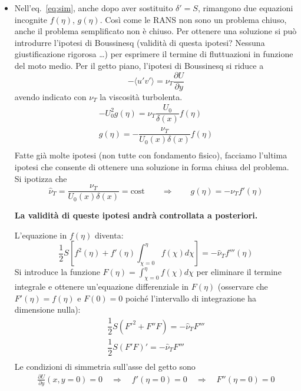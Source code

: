 \begin{itemize}
\item Nell'eq.~\ref{eq:sim}, anche dopo aver sostituito $\delta' = S$, 
 rimangono due equazioni incognite $f(\eta)$, $g(\eta)$. Così come 
 le RANS non sono un problema chiuso, anche il problema semplificato
 non è chiuso.
 Per ottenere una soluzione si può introdurre l'ipotesi di Boussinesq
 (validità di questa ipotesi? Nessuna giustificazione rigorosa \dots)
 per esprimere il termine di fluttuazioni in funzione del moto medio.
 Per il getto piano, l'ipotesi di Boussinesq si riduce a
 \begin{equation}
  - \langle u'v' \rangle = \nu_T \dfrac{\partial U}{\partial y}
 \end{equation}
 avendo indicato con $\nu_T$ la viscosità turbolenta.
 \begin{gather}
  - U^2_0 g(\eta) = \nu_T \dfrac{U_0}{\delta(x)} f(\eta) \\
   g(\eta) = - \dfrac{\nu_T}{U_0(x)\delta(x)} f(\eta) \\
 \end{gather}
 Fatte già molte ipotesi (non tutte con fondamento fisico), facciamo 
 l'ultima ipotesi che consente di ottenere una soluzione in forma 
 chiusa del problema. Si ipotizza che 
 \begin{equation}
  \hat{\nu}_T = \dfrac{\nu_T}{U_0(x)\delta(x)} = \text{cost}
  \qquad \Rightarrow \qquad g(\eta) = - \nu_T f'(\eta)
 \end{equation}

 \textbf{La validità di queste ipotesi andrà controllata
 a posteriori.}

 L'equazione in $f(\eta)$ diventa:
 \begin{equation}
  \dfrac{1}{2} S \left[ f^2(\eta)
    + f'(\eta)\int_{\chi=0}^{\eta} f(\chi) d\chi \right] = 
    - \hat{\nu}_T f'''(\eta)
 \end{equation}
 Si introduce la funzione $F(\eta) = \int_{\chi=0}^{\eta} f(\chi)d\chi$
 per eliminare il termine integrale e ottenere un'equazione differenziale
 in $F(\eta)$ (osservare che $F'(\eta) = f(\eta)$ e $F(0)=0$ poiché
 l'intervallo di integrazione ha dimensione nulla):
 \begin{gather}
   \dfrac{1}{2}S \left( F'^2 + F'' F \right) = -\hat{\nu}_T F''' \\
   \dfrac{1}{2}S \left( F'F \right)' = -\hat{\nu}_T F''' \\
 \end{gather}
 Le condizioni di simmetria sull'asse del getto sono
 \begin{equation}
  \begin{aligned}
   \frac{\partial U}{\partial y}(x,y=0) = 0 \quad \Rightarrow \quad
     f'(\eta=0) = 0 \quad \Rightarrow \quad F''(\eta=0) = 0
  \end{aligned}
 \end{equation}


\end{itemize}
